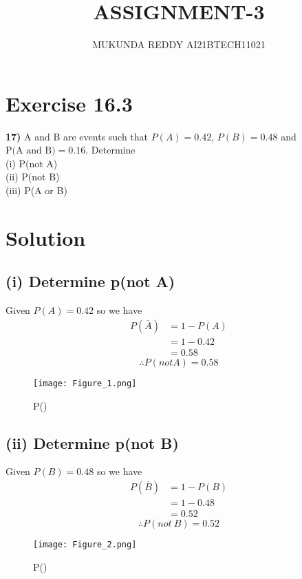 \documentclass[journal,12pt,twocolumn]{article}
\begin{document}
\title{ASSIGNMENT-3}
\author{MUKUNDA REDDY AI21BTECH11021}
\date{}
\maketitle
\section*{Exercise 16.3}
\textbf{17)} A and B are events such that ${P(A) = 0.42}$, ${P(B) = 0.48}$ and
${\text{P(A and B)} = 0.16}$. Determine\\
 (i)  P(not A)\\
(ii)  P(not B) \\
(iii) P(A or B) \\
\hline

\section*{Solution}
\subsection*{(i) Determine p(not A)}
Given $P(A) = 0.42$ so we have
\begin{align*}
    P(\overline{A}) &= 1 - P(A)\\ 
                    &= 1 - 0.42\\   
                    &= 0.58 
\end{align*}
\begin{equation}
 \therefore P(not A) = 0.58    
\end{equation}

\begin{figure}[H]
    \centering
    \texttt{[image: Figure\_1.png]}
    \caption{P()}
    \label{fig:1}
\end{figure}


\subsection*{(ii) Determine p(not B)}
Given $P(B) = 0.48$ so we have
\begin{align*}
    P(\overline{B}) &= 1 - P(B)\\ 
                    &= 1 - 0.48\\   
                    &= 0.52
\end{align*}
\begin{equation}
 \therefore P(not \ B) = 0.52   
\end{equation}
\begin{figure}[H]
    \centering
    \texttt{[image: Figure\_2.png]}
    \caption{P()}
    \label{fig:2}
\end{figure}
\end{document}
